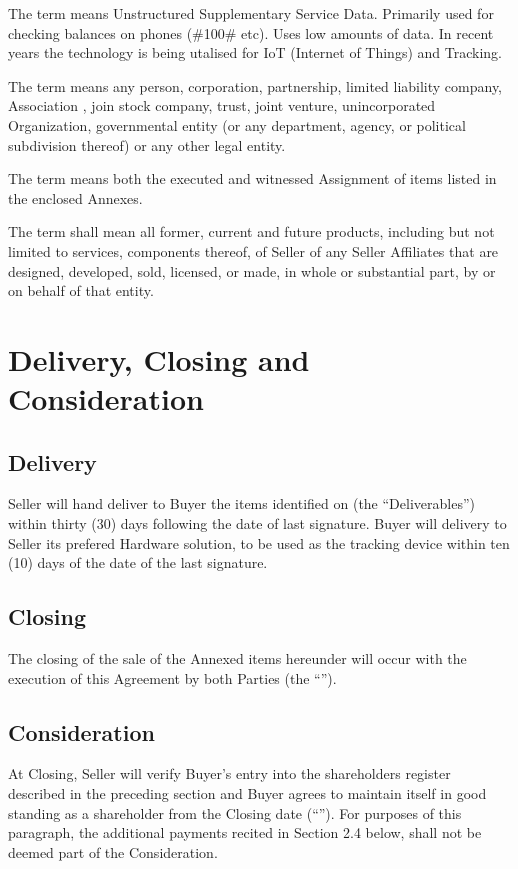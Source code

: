 \documentclass[letterpaper,10pt,english]{sphinxmanual}
\begin{document}
The term  means Unstructured Supplementary Service Data. Primarily used for checking balances on phones (\#100\# etc). Uses low amounts of data. In recent years the technology is being utalised for IoT (Internet of Things) and Tracking.

The term  means any person, corporation, partnership, limited liability company, Association , join stock company, trust, joint venture, unincorporated Organization, governmental entity (or any department, agency, or political subdivision thereof) or any other legal entity.

The term  means both the executed and witnessed Assignment of items listed in the enclosed Annexes.

The term  shall mean all former, current and future products, including but not limited to services, components thereof, of Seller of any Seller Affiliates that are designed, developed, sold, licensed, or made, in whole or substantial part, by or on behalf of that entity.


\section{Delivery, Closing and Consideration}
\label{\detokenize{2-delivery:delivery-closing-and-consideration}}\label{\detokenize{2-delivery::doc}}

\subsection{Delivery}
\label{\detokenize{2-delivery:delivery}}
Seller will hand deliver to Buyer the items identified on  (the “Deliverables”) within thirty (30) days following the date of last signature.
Buyer will delivery to Seller its prefered Hardware solution, to be used as the tracking device within ten (10) days of the date of the last signature.


\subsection{Closing}
\label{\detokenize{2-delivery:closing}}
The closing of the sale of the Annexed items hereunder will occur with the execution of this Agreement by both Parties (the “”).


\subsection{Consideration}
\label{\detokenize{2-delivery:consideration}}
At Closing, Seller will verify Buyer’s entry into the shareholders register described in the preceding section and Buyer agrees to maintain itself in good standing as a shareholder from the Closing date (“”). For purposes of this paragraph, the additional payments recited in Section 2.4 below, shall not be deemed part of the Consideration.
\end{document}
